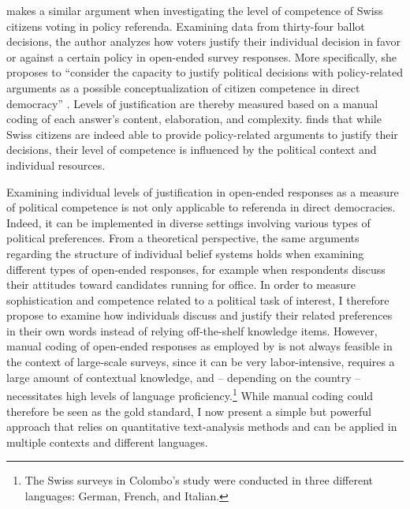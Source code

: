 \documentclass[12pt]{article}
\begin{document}
\citet{colombo2016justifications} makes a similar argument when investigating the level of competence of Swiss citizens voting in policy referenda. Examining data from thirty-four ballot decisions, the author analyzes how voters justify their individual decision in favor or against a certain policy in open-ended survey responses. More specifically, she proposes to ``consider the capacity to justify political decisions with policy-related arguments as a possible conceptualization of citizen competence in direct democracy'' \citep[3]{colombo2016justifications}. Levels of justification are thereby measured based on a manual coding of each answer's content, elaboration, and complexity. \citet{colombo2016justifications} finds that while Swiss citizens are indeed able to provide policy-related arguments to justify their decisions, their level of competence is influenced by the political context and individual resources.

Examining individual levels of justification in open-ended responses as a measure of political competence is not only applicable to referenda in direct democracies. Indeed, it can be implemented in diverse settings involving various types of political preferences. From a theoretical perspective, the same arguments regarding the structure of individual belief systems holds when examining different types of open-ended responses, for example when respondents discuss their attitudes toward candidates running for office. In order to measure sophistication and competence related to a political task of interest, I therefore propose to examine how individuals discuss and justify their related preferences in their own words instead of relying off-the-shelf knowledge items. However, manual coding of open-ended responses as employed by \citet{colombo2016justifications} is not always feasible in the context of large-scale surveys, since it can be very labor-intensive, requires a large amount of contextual knowledge, and -- depending on the country -- necessitates high levels of language proficiency.\footnote{The Swiss surveys in Colombo's \citeyearpar{colombo2016justifications} study were conducted in three different languages: German, French, and Italian.} While manual coding could therefore be seen as the gold standard, I now present a simple but powerful approach that relies on quantitative text-analysis methods and can be applied in multiple contexts and different languages.


\end{document}
